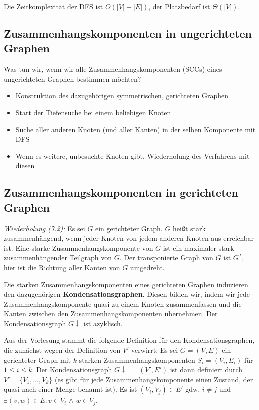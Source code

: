 \documentclass[12pt]{article}
\begin{document}
Die Zeitkomplexität der DFS ist $O(|V| + |E|)$, der Platzbedarf ist $\Theta(|V|)$.

\subsection{Zusammenhangskomponenten in ungerichteten Graphen}

Was tun wir, wenn wir alle Zusammenhangskomponenten (SCCs) eines ungerichteten Graphen bestimmen möchten?

\begin{itemize}
\item Konstruktion des dazugehörigen symmetrischen, gerichteten Graphen
\item Start der Tiefensuche bei einem beliebigen Knoten
\item Suche aller anderen Knoten (und aller Kanten) in der selben Komponente mit DFS
\item Wenn es weitere, unbesuchte Knoten gibt, Wiederholung des Verfahrens mit diesen
\end{itemize}

\subsection{Zusammenhangskomponenten in gerichteten Graphen}

\textit{Wiederholung (7.2):} Es sei $G$ ein gerichteter Graph. $G$ heißt stark zusammenhängend, wenn jeder Knoten von jedem anderen Knoten aus erreichbar ist. Eine starke Zusammenhangskomponente von $G$ ist ein maximaler stark zusammenhängender Teilgraph von $G$. Der transponierte Graph von $G$ ist $G^T$, hier ist die Richtung aller Kanten von $G$ umgedreht.

Die starken Zusammenhangskomponenten eines gerichteten Graphen induzieren den dazugehörigen \textbf{Kondensationsgraphen}. Diesen bilden wir, indem wir jede Zusammenhangskomponente quasi zu einem Knoten zusammenfassen und die Kanten zwischen den Zusammenhangskomponenten übernehmen. Der Kondensationsgraph $G\downarrow$ ist azyklisch.

Aus der Vorlesung stammt die folgende Definition für den Kondensationsgraphen, die zunächst wegen der Definition von $V'$ verwirrt: Es sei $G = (V, E)$ ein gerichteter Graph mit $k$ starken Zusammenhangskomponenten $S_i = (V_i, E_i)$ für $1 \leq i \leq k$. Der Kondensationsgraph $G\downarrow$ $= (V', E')$ ist dann definiert durch $V' = \{V_1, ..., V_k\}$ (es gibt für jede Zusammenhangskomponente einen Zustand, der quasi nach einer Menge benannt ist). Es ist $(V_i, V_j) \in E'$ gdw. $i \neq j$ und $\exists(v, w) \in E : v \in V_i$ $\land$ $w \in V_j$.
\end{document}
